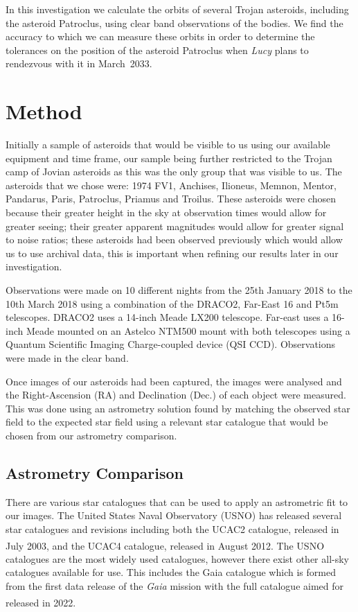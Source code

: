 \documentclass[10pt, twocolumn]{revtex4}    %
\newcommand{\scite}[1]{\textsuperscript{\cite{#1}}}
\begin{document}
In this investigation we calculate the orbits of several Trojan asteroids, including the asteroid Patroclus, using clear band observations of the bodies. We find the accuracy to which we can measure these orbits in order to determine the tolerances on the position of the asteroid Patroclus when \textit{Lucy} plans to rendezvous with it in March~2033.

\section{Method}

Initially a sample of asteroids that would be visible to us using our available equipment and time frame, our sample being further restricted to the Trojan camp of Jovian asteroids as this was the only group that was visible to us. The asteroids that we chose were: 1974 FV1, Anchises, Ilioneus, Memnon, Mentor, Pandarus, Paris, Patroclus, Priamus and Troilus. These asteroids were chosen because their greater height in the sky at observation times would allow for greater seeing; their greater apparent magnitudes would allow for greater signal to noise ratios; these asteroids had been observed previously which would allow us to use archival data, this is important when refining our results later in our investigation.

Observations were made on 10 different nights from the 25th January 2018 to the 10th March 2018 using a combination of the DRACO2, Far-East 16 and Pt5m telescopes. DRACO2 uses a 14-inch Meade LX200 telescope. Far-east uses a 16-inch Meade mounted on an Astelco NTM500 mount with both telescopes using a Quantum Scientific Imaging Charge-coupled device (QSI CCD). Observations were made in the clear band.

Once images of our asteroids had been captured, the images were analysed and the Right-Ascension (RA) and Declination (Dec.) of each object were measured. This was done using an astrometry solution found by matching the observed star field to the expected star field using a relevant star catalogue that would be chosen from our astrometry comparison. 

\subsection*{Astrometry Comparison}

There are various star catalogues that can be used to apply an astrometric fit to our images. The United States Naval Observatory (USNO) has released several star catalogues and revisions including both the UCAC2 catalogue, released in July 2003, and the UCAC4 catalogue, released in August 2012.\scite{ZachariassecondUSNaval2004}\scite{ZachariasFourthUSNaval2012} The USNO catalogues are the most widely used catalogues, however there exist other all-sky catalogues available for use. This includes the Gaia catalogue which is formed from the first data release of the \textit{Gaia} mission with the full catalogue aimed for released in 2022.\scite{GaiaCollaborationGaiaDataRelease2016}
\end{document}

